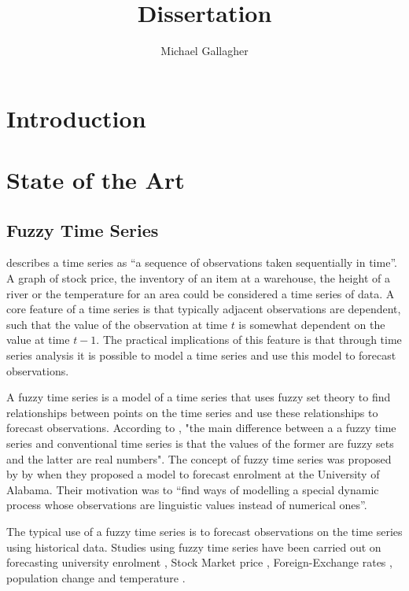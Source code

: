 \documentclass{article}
\title{Dissertation}
\author{Michael Gallagher}
\theoremstyle{definition}
\begin{document}
\maketitle

\tableofcontents

\section{Introduction}

\section{State of the Art}

\subsection{Fuzzy Time Series}

\cite{box2013time} describes a time series as ``a sequence of observations taken sequentially in time''. A graph of stock price, the inventory of an item at a warehouse, the height of a river or the temperature for an area could be considered a time series of data. A core feature of a time series is that typically adjacent observations are dependent, such that the value of the observation at time $t$ is somewhat dependent on the value at time $t-1$. The practical implications of this feature is that through time series analysis it is possible to model a time series and use this model to forecast observations.

A fuzzy time series is a model of a time series that uses fuzzy set theory to find relationships between points on the time series and use these relationships to forecast observations. According to \cite{chen1996forecasting}, "the main difference between a a fuzzy time series and conventional time series is that the values of the former are fuzzy sets and the latter are real numbers". The concept of fuzzy time series was proposed by by \cite{song1993forecasting, song1994forecasting} when they proposed a model to forecast enrolment at the University of Alabama. Their motivation was to ``find ways of modelling a special dynamic process whose observations are linguistic values instead of numerical ones''. 

The typical use of a fuzzy time series is to forecast observations on the time series using historical data. Studies using fuzzy time series have been carried out on forecasting university enrolment \citep{song1993forecasting, song1994forecasting, chen1996forecasting, tsai2000forecasting, chen2004new, cheng2006trend, lee2006pattern, huarng2006ratio, tsaur2012fuzzy}, Stock Market price \citep{huarng2005type, cheng2006trend, lee2006pattern, huarng2006ratio, Chen2007fib, chu2009fuzzy}, Foreign-Exchange rates \citep{tsaur2012fuzzy}, population change \citep{tsai1999study} and temperature \citep{temperatureprediction2000, lee2006pattern}.
\end{document}
